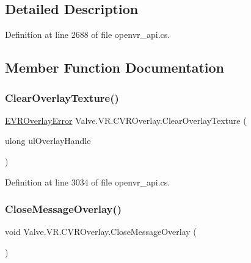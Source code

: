 \subsection{Detailed Description}


Definition at line 2688 of file openvr\+\_\+api.\+cs.



\subsection{Member Function Documentation}
\mbox{\label{class_valve_1_1_v_r_1_1_c_v_r_overlay_a5b5225eecf368458d61264b16342e399}} 
\subsubsection{\texorpdfstring{ClearOverlayTexture()}{ClearOverlayTexture()}}
{\footnotesize\ttfamily \mbox{\hyperlink{namespace_valve_1_1_v_r_aaee5c5144f42b7969d45b854f51b0c18}{E\+V\+R\+Overlay\+Error}} Valve.\+V\+R.\+C\+V\+R\+Overlay.\+Clear\+Overlay\+Texture (\begin{DoxyParamCaption}\item[{ulong}]{ul\+Overlay\+Handle }\end{DoxyParamCaption})}



Definition at line 3034 of file openvr\+\_\+api.\+cs.

\mbox{\label{class_valve_1_1_v_r_1_1_c_v_r_overlay_a2b2c9997673969df0565f26144132867}} 
\subsubsection{\texorpdfstring{CloseMessageOverlay()}{CloseMessageOverlay()}}
{\footnotesize\ttfamily void Valve.\+V\+R.\+C\+V\+R\+Overlay.\+Close\+Message\+Overlay (\begin{DoxyParamCaption}{ }\end{DoxyParamCaption})}



